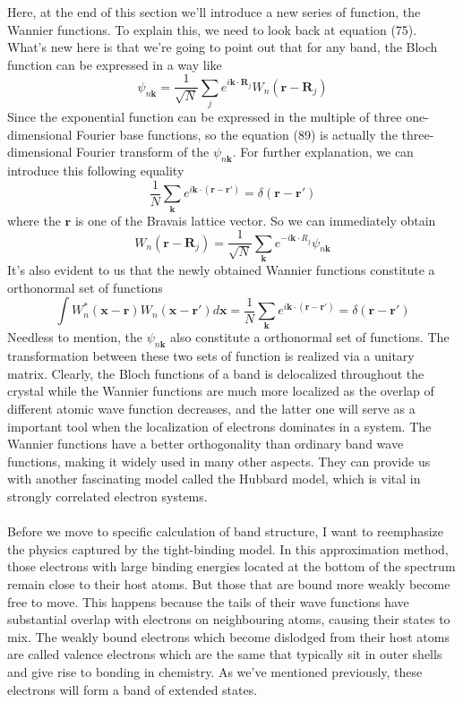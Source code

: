 \documentclass{article}
\begin{document}
Here, at the end of this section we'll introduce a new series of function, the Wannier functions. To explain this, we need to look back at equation (75). What's new here is that we're going to point out that for any band, the Bloch function can be expressed in a way like\begin{equation}
    \psi_{n\mathbf{k}}=\frac{1}{\sqrt{N}}\sum_{j}e^{i\mathbf{k}\cdot\mathbf{R}_j}W_n(\mathbf{r}-\mathbf{R}_j)
\end{equation}Since the exponential function can be expressed in the multiple of three one-dimensional Fourier base functions, so the equation (89) is actually the three-dimensional Fourier transform of the $\psi_{n\mathbf{k}}$. For further explanation, we can introduce this following equality\begin{equation}
    \frac{1}{N}\sum_{\mathbf{k}}e^{i\mathbf{k}\cdot(\mathbf{r}-\mathbf{r}')}=\delta(\mathbf{r}-\mathbf{r}')
\end{equation}where the $\mathbf{r}$ is one of the Bravais lattice vector. So we can immediately obtain\begin{equation}
    W_n(\mathbf{r}-\mathbf{R}_j)=\frac{1}{\sqrt{N}}\sum_{\mathbf{k}}e^{-i\mathbf{k}\cdot{R}_j}\psi_{n\mathbf{k}}
\end{equation}It's also evident to us that the newly obtained Wannier functions constitute a orthonormal set of functions\begin{equation}
    \int{W}_n^*(\mathbf{x}-\mathbf{r}){W}_n(\mathbf{x}-\mathbf{r}')d\mathbf{x}=\frac{1}{N}\sum_{\mathbf{k}}e^{i\mathbf{k}\cdot(\mathbf{r}-\mathbf{r}')}=\delta(\mathbf{r}-\mathbf{r}')
\end{equation}Needless to mention, the $\psi_{n\mathbf{k}}$ also constitute a orthonormal set of functions. The transformation between these two sets of function is realized via a unitary matrix. Clearly, the Bloch functions of a band is delocalized throughout the crystal while the Wannier functions are much more localized as the overlap of different atomic wave function decreases, and the latter one will serve as a important tool when the localization of electrons dominates in a system. The Wannier functions have a better orthogonality than ordinary band wave functions, making it widely used in many other aspects. They can provide us with another fascinating model called the Hubbard model, which is vital in strongly correlated electron systems.\\
\\
Before we move to specific calculation of band structure, I want to reemphasize the physics captured by the tight-binding model. In this approximation method, those electrons with large binding energies located at the bottom of the spectrum remain close to their host atoms. But those that are bound more weakly become free to move. This happens because the tails of their wave functions have substantial overlap with electrons on neighbouring atoms, causing their states to mix. The weakly bound electrons which become dislodged from their host atoms are called valence electrons which are the same that typically sit in outer shells and give rise to bonding in chemistry. As we've mentioned previously, these electrons will form a band of extended states.
\end{document}
